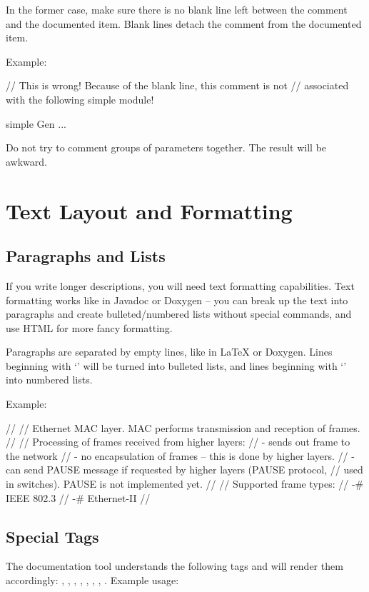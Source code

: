 In the former case, make sure there is no blank line left
between the comment and the documented item. Blank lines
detach the comment from the documented item.

Example:
\begin{ned}
// This is wrong! Because of the blank line, this comment is not
// associated with the following simple module!

simple Gen
{
    ...
}
\end{ned}

Do not try to comment groups of parameters together. The result
will be awkward.

\section{Text Layout and Formatting}

\subsection{Paragraphs and Lists}

If you write longer descriptions, you will need text formatting capabilities.
Text formatting works like in Javadoc or Doxygen -- you can break up the
text into paragraphs and create bulleted/numbered lists without
special commands, and use HTML for more fancy formatting.

Paragraphs are separated by empty lines, like in LaTeX or Doxygen.
Lines beginning with `\ttt{-}' will be turned into bulleted lists,
and lines beginning with `\ttt{-\#}' into numbered lists.

Example:

\begin{ned}
//
// Ethernet MAC layer. MAC performs transmission and reception of frames.
//
// Processing of frames received from higher layers:
// - sends out frame to the network
// - no encapsulation of frames -- this is done by higher layers.
// - can send PAUSE message if requested by higher layers (PAUSE protocol,
//   used in switches). PAUSE is not implemented yet.
//
// Supported frame types:
// -# IEEE 802.3
// -# Ethernet-II
//
\end{ned}


\subsection{Special Tags}

The documentation tool understands the following tags and will render them accordingly:
, , , , , ,
, . Example usage:

